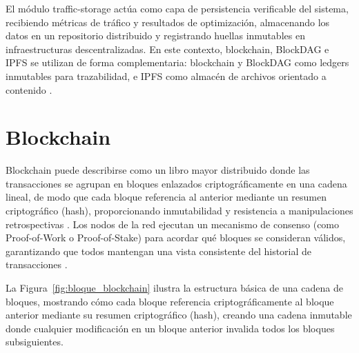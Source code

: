 \label{sec:decentralized_tech_traffic_storage}

El módulo traffic-storage actúa como capa de persistencia verificable del sistema, recibiendo métricas de tráfico y resultados de optimización, almacenando los datos en un repositorio distribuido y registrando huellas inmutables en infraestructuras descentralizadas. En este contexto, blockchain, BlockDAG e IPFS se utilizan de forma complementaria: blockchain y BlockDAG como ledgers inmutables para trazabilidad, e IPFS como almacén de archivos orientado a contenido \cite{nakamoto2008bitcoin,benet2014ipfs,sompolinsky2021phantom}.

\section{Blockchain}
\label{subsec:blockchain_traffic_storage}

Blockchain puede describirse como un libro mayor distribuido donde las transacciones se agrupan en bloques enlazados criptográficamente en una cadena lineal, de modo que cada bloque referencia al anterior mediante un resumen criptográfico (hash), proporcionando inmutabilidad y resistencia a manipulaciones retrospectivas \cite{nakamoto2008bitcoin,narayanan2016bitcoin}. Los nodos de la red ejecutan un mecanismo de consenso (como Proof-of-Work o Proof-of-Stake) para acordar qué bloques se consideran válidos, garantizando que todos mantengan una vista consistente del historial de transacciones \cite{buterin2014ethereum,garay2015backbone}.

La Figura~\ref{fig:bloque_blockchain} ilustra la estructura básica de una cadena de bloques, mostrando cómo cada bloque referencia criptográficamente al bloque anterior mediante su resumen criptográfico (hash), creando una cadena inmutable donde cualquier modificación en un bloque anterior invalida todos los bloques subsiguientes.

